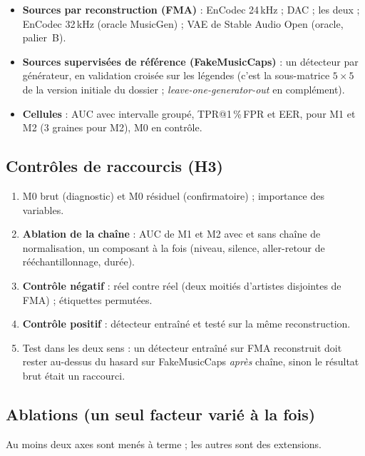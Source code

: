 \documentclass[11pt,a4paper]{article}
\makeatletter
\newcommand{\tprfpr}{TPR@1\,\%\,FPR}
\makeatother
\begin{document}
\begin{itemize}
  \item \textbf{Sources par reconstruction (FMA)} : EnCodec 24\,kHz ; DAC ; les deux ; EnCodec 32\,kHz (oracle MusicGen) ; VAE de Stable Audio Open (oracle, palier~B).
  \item \textbf{Sources supervisées de référence (FakeMusicCaps)} : un détecteur par générateur, en validation croisée sur les légendes (c'est la sous-matrice $5\times 5$ de la version initiale du dossier ; \emph{leave-one-generator-out} en complément).
  \item \textbf{Cellules} : AUC avec intervalle groupé, \tprfpr{} et EER, pour M1 et M2 (3 graines pour M2), M0 en contrôle.
\end{itemize}

\subsection{Contrôles de raccourcis (H3)}

\begin{enumerate}
  \item M0 brut (diagnostic) et M0 résiduel (confirmatoire) ; importance des variables.
  \item \textbf{Ablation de la chaîne} : AUC de M1 et M2 avec et sans chaîne de normalisation, un composant à la fois (niveau, silence, aller-retour de rééchantillonnage, durée).
  \item \textbf{Contrôle négatif} : réel contre réel (deux moitiés d'artistes disjointes de FMA) ; étiquettes permutées.
  \item \textbf{Contrôle positif} : détecteur entraîné et testé sur la même reconstruction.
  \item Test dans les deux sens : un détecteur entraîné sur FMA reconstruit doit rester au-dessus du hasard sur FakeMusicCaps \emph{après} chaîne, sinon le résultat brut était un raccourci.
\end{enumerate}

\subsection{Ablations (un seul facteur varié à la fois)}
\label{sec:ablations}

Au moins deux axes sont menés à terme ; les autres sont des extensions.
\end{document}
